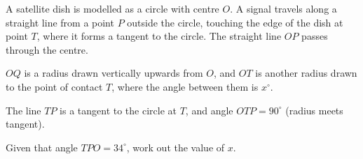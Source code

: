 \begin{question}
\noindent A satellite dish is modelled as a circle with centre $O$. A signal travels along a straight line from a point $P$ outside the circle, touching the edge of the dish at point $T$, where it forms a tangent to the circle. The straight line $OP$ passes through the centre.

\begin{center}
\end{center}

\noindent $OQ$ is a radius drawn vertically upwards from $O$, and $OT$ is another radius drawn to the point of contact $T$, where the angle between them is $x^\circ$.

\noindent The line $TP$ is a tangent to the circle at $T$, and angle $OTP = 90^\circ$ (radius meets tangent).

\noindent Given that angle $TPO = 34^\circ$, work out the value of $x$.

\vspace{4cm}

\begin{flushright}
\end{flushright}
\end{question}

